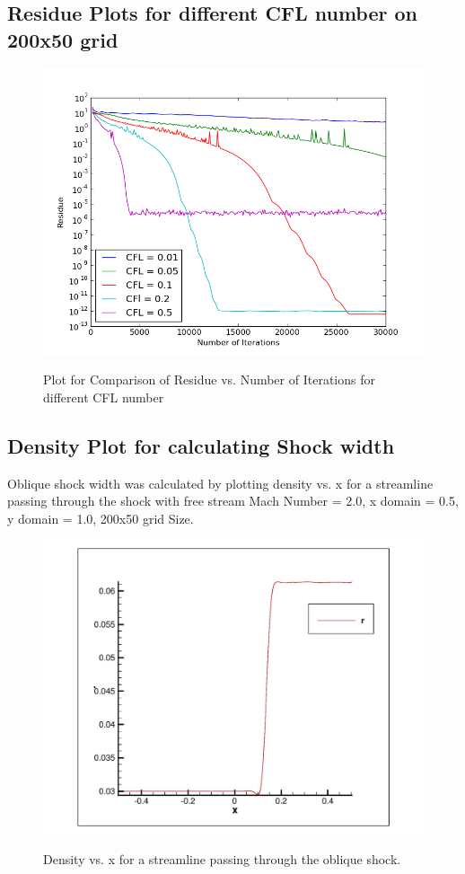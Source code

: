 \documentclass{article}
\begin{document}
\newpage
\subsection*{Residue Plots for different CFL number on 200x50 grid}
\begin{figure}[H]   \label{figure}
\includegraphics[width=15cm]{residue1.png}		%
\label{figure:}
\caption{Plot for Comparison of Residue vs. Number of Iterations for different CFL number}
\end{figure}


\newpage
\subsection*{Density Plot for calculating Shock width}
Oblique shock width was calculated by plotting density vs. x for a streamline passing through the shock with free stream Mach Number = 2.0, x domain = 0.5, y domain = 1.0, 200x50 grid Size.
\begin{figure}[H]   \label{figure}
\includegraphics[width=15cm]{200x50/density.jpg}		%
\label{figure:}
\caption{Density vs. x for a streamline passing through the oblique shock.}
\end{figure}
\end{document}
